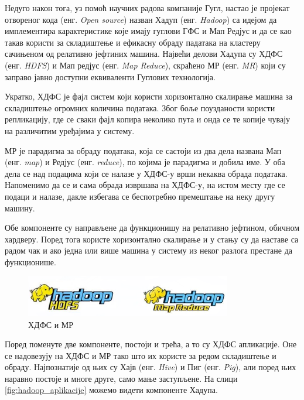 \documentclass[12pt,oneside]{memoir}
\begin{document}
Недуго након тога, уз помоћ научних радова компаније Гугл, настао је пројекат отвореног кода (енг. \textit{Open source}) назван Хадуп (енг. \textit{Hadoop}) са идејом да имплементира карактеристике које имају гуглови ГФС и Мап Редјус и да се као такав користи за складиштење и ефикасну обраду падатака на кластеру сачињеном од релативно јефтиних машина. Највећи делови Хадупа су ХДФС (енг. \textit{HDFS}) и Мап редјус (енг. \textit{Map Reduce}), скраћено МР (енг. \textit{MR}) који су заправо јавно доступни еквиваленти Гуглових технологија. \cite{hadoop_beginner}

Укратко, ХДФС је фајл систем који користи хоризонтално скалирање машина за складиштење огромних количина података. Због боље поузданости користи репликацију, где се сваки фајл копира неколико пута и онда се те копије чувају на различитим уређајима у систему. \cite{hadoop_beginner}

МР је парадигма за обраду података, која се састоји из два дела названа Мап (енг. \textit{map}) и Редјус (енг. \textit{reduce}), по којима је парадигма и добила име. У оба дела се над подацима који се налазе у ХДФС-у врши некаква обрада података. Напоменимо да се и сама обрада извршава на ХДФС-у, на истом месту где се подаци и налазе, дакле избегава се беспотребно премештање на неку другу машину. \cite{hadoop_beginner}

Обе компоненте су направљене да функционишу на релативно јефтином, обичном хардверу. Поред тога користе хоризонтално скалирање и у стању су да наставе са радом чак и ако једна или више машина у систему из неког разлога престане да функционише.

\begin{figure}[!ht]
  \centering
  \includegraphics[width=0.8\textwidth]{pictures/hdfs_mr_logo.png}
  \caption{ХДФС и МР}
  \label{fig:hdfs_mr_logo}
\end{figure}

Поред поменуте две компоненте, постоји и трећа, а то су ХДФС апликације. Оне се надовезују на ХДФС и МР тако што их користе за редом складиштење и обраду. Најпознатије од њих су Хајв (енг. \textit{Hive}) и Пиг (енг. \textit{Pig}), али поред њих наравно постоје и многе друге, само мање заступљене. На слици \ref{fig:hadoop_aplikacije} можемо видети компоненте Хадупа. \cite{hadoop_learning}
\end{document}
